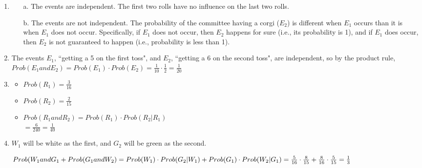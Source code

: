 {\begin{enumerate}
        \item
            \begin{itemize}
                \item[a.]   The events are independent. The first two rolls
                            have no influence on the last two rolls.
                            
                \item[b.]   The events are not independent. The probability
                            of the committee having a corgi ($E_{2}$) is different
                            when $E_{1}$ occurs than it is when $E_{1}$ does not occur.
                            Specifically, if $E_{1}$ does not occur, then $E_{2}$ happens
                            for sure (i.e., its probability is 1), and if $E_{1}$ does occur,
                            then $E_{2}$ is not guaranteed to happen (i.e., probability is
                            less than 1).
            \end{itemize}

        \item   The events $E_{1}$, ``getting a 5 on the first toss",
                and $E_{2}$, ``getting a 6 on the second toss", are independent,
                so by the product rule,
                $Prob(E_{1} and E_{2}) = Prob(E_{1}) \cdot Prob(E_{2}) = \frac{1}{10} \cdot \frac{1}{2}
                = \frac{1}{20}$

        \item
            \begin{itemize}
                \item   $Prob(R_{1}) = \frac{3}{16}$
                \item   $Prob(R_{2}) = \frac{2}{15}$
                \item   $Prob(R_{1} and R_{2}) = Prob(R_{1}) \cdot Prob(R_{2} | R_{1})$ \\
                        $ = \frac{6}{240} = \frac{1}{40}$
            \end{itemize}

        \item   $W_{1}$ will be white as the first, and $G_{2}$ will be green as the second.

                $Prob(W_{1} and G_{1} + Prob(G_{1} and W_{2}) = \\
                    Prob(W_{1}) \cdot Prob(G_{2} | W_{1}) + Prob(G_{1}) \cdot Prob(W_{2}|G_{1}) \\
                    = \frac{5}{16} \cdot \frac{8}{15} + \frac{8}{16} \cdot \frac{5}{15} = \frac{1}{3}$
    \end{enumerate}

}


